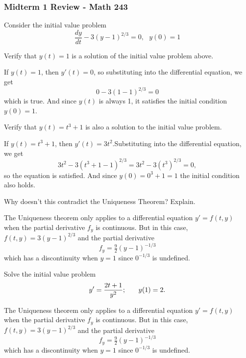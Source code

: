 \documentclass[11pt]{exam}
\begin{document}
\graphicspath{{/home/brian/Dropbox/HSC/Spring16/Math111/}}

\subsubsection*{Midterm 1 Review - Math 243}

\begin{questions}
\question Consider the initial value problem
$$\frac{dy}{dt}-3(y-1)^{2/3}=0,~~~ y(0)=1$$
\begin{parts}
\item Verify that $y(t) = 1$ is a solution of the initial value problem above.  
\begin{solution}
If $y(t) = 1$, then $y'(t) = 0$, so substituting into the differential equation, we get
$$0  - 3(1 -1)^{2/3} = 0$$
which is true. And since $y(t)$ is always 1, it satisfies the initial condition $y(0) = 1$.
\end{solution}
\vfill

\item Verify that $y(t) = t^3+1$ is also a solution to the initial value problem.   
\begin{solution}
If $y(t) = t^3 + 1$, then $y'(t) = 3t^2$.Substituting into the differential equation, we get
$$3t^2  - 3(t^3 + 1 -1)^{2/3} = 3t^2 - 3(t^3)^{2/3} = 0,$$
so the equation is satisfied. And since $y(0) = 0^3 + 1 = 1$ the initial condition also holds.
\end{solution}
\vfill

\item Why doesn't this contradict the Uniqueness Theorem?  Explain. 
\begin{solution}
The Uniqueness theorem only applies to a differential equation $y' = f(t,y)$ when the partial derivative $f_y$ is continuous.  But in this case, $f(t,y) = 3(y-1)^{2/3}$ and the partial derivative 
$$f_y = \tfrac{9}{2} (y - 1)^{-1/3}$$
which has a discontinuity when $y = 1$ since $0^{-1/3}$ is undefined.  
\end{solution}
\vfill
\end{parts}
\question Solve the initial value problem
$$y' = \frac{2t+1}{y^2}; \hspace{0.25in} y(1) = 2.$$ 
\begin{solution}
The Uniqueness theorem only applies to a differential equation $y' = f(t,y)$ when the partial derivative $f_y$ is continuous.  But in this case, $f(t,y) = 3(y-1)^{2/3}$ and the partial derivative 
$$f_y = \tfrac{9}{2} (y - 1)^{-1/3}$$
which has a discontinuity when $y = 1$ since $0^{-1/3}$ is undefined.  
\end{solution}


\end{questions}
\end{document}
